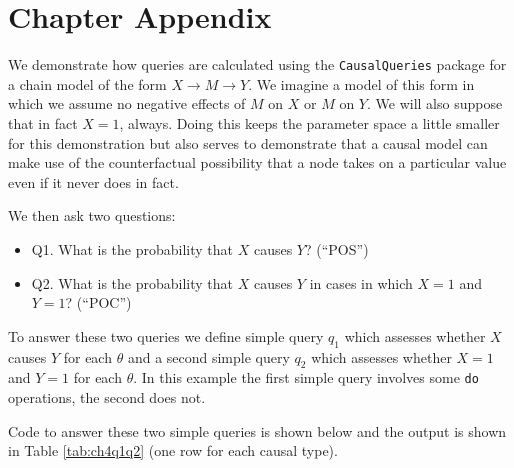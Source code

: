 \documentclass[
  12pt,
]{book}
\providecommand{\tightlist}{%
  \setlength{\itemsep}{0pt}\setlength{\parskip}{0pt}}
\begin{document}
\hypertarget{chapter-appendix-1}{%
\section{Chapter Appendix}\label{chapter-appendix-1}}

We demonstrate how queries are calculated using the \texttt{CausalQueries} package for a chain model of the form \(X \rightarrow M \rightarrow Y\). We imagine a model of this form in which we assume no negative effects of \(M\) on \(X\) or \(M\) on \(Y\). We will also suppose that in fact \(X=1\), always. Doing this keeps the parameter space a little smaller for this demonstration but also serves to demonstrate that a causal model can make use of the counterfactual possibility that a node takes on a particular value even if it never does in fact.

We then ask two questions:

\begin{itemize}
\tightlist
\item
  Q1. What is the probability that \(X\) causes \(Y\)? (``POS'')
\item
  Q2. What is the probability that \(X\) causes \(Y\) in cases in which \(X=1\) and \(Y=1\)? (``POC'')
\end{itemize}

To answer these two queries we define simple query \(q_1\) which assesses whether \(X\) causes \(Y\) for each \(\theta\) and a second simple query \(q_2\) which assesses whether \(X=1\) and \(Y=1\) for each \(\theta\). In this example the first simple query involves some \texttt{do} operations, the second does not.

Code to answer these two simple queries is shown below and the output is shown in Table \ref{tab:ch4q1q2} (one row for each causal type).
\end{document}
